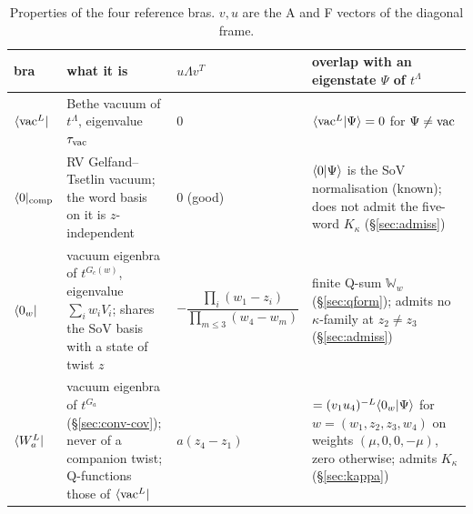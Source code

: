 \begin{table}[ht]
\centering
\footnotesize
\renewcommand{\arraystretch}{1.3}
\begin{tabular}{@{}>{\raggedright\arraybackslash}p{}>{\raggedright\arraybackslash}p{}>{\raggedright\arraybackslash}p{}>{\raggedright\arraybackslash}p{}@{}}
\toprule
bra & what it is & $u\Lambda v^T$ & overlap with an eigenstate $\Psi$ of $t^\Lambda$\\
\midrule
$\langle\mathrm{vac}^L|$ & Bethe vacuum of $t^\Lambda$, eigenvalue $\tau_{\rm vac}$ & $0$ & $\langle\mathrm{vac}^L|\Psi\rangle=0$ for $\Psi\ne\mathrm{vac}$\\
$\langle0|_{\rm comp}$ & RV Gelfand--Tsetlin vacuum; the word basis on it is $z$-independent & $0$ (good) &
 $\langle0|\Psi\rangle$ is the SoV normalisation (known); does not admit the five-word $K_\kappa$ (\S\ref{sec:admiss})\\
$\langle0_w|$ & vacuum eigenbra of $t^{G_c(w)}$, eigenvalue $\sum_iw_iV_i$; shares the SoV basis with a state of twist $z$ &
 $-\dfrac{\prod_i(w_1-z_i)}{\prod_{m\le3}(w_4-w_m)}$ &
 finite Q-sum $\mathbb W_w$ (\S\ref{sec:qform}); admits no $\kappa$-family at $z_2\ne z_3$ (\S\ref{sec:admiss})\\
$\langle W_a^L|$ & vacuum eigenbra of $t^{G_a}$ (\S\ref{sec:conv-cov}); never of a companion twist; Q-functions those of $\langle\mathrm{vac}^L|$ &
 $a(z_4-z_1)$ &
 $=(v_1u_4)^{-L}\langle0_w|\Psi\rangle$ for $w=(w_1,z_2,z_3,w_4)$ on weights $(\mu,0,0,-\mu)$, zero otherwise; admits $K_\kappa$ (\S\ref{sec:kappa})\\
\bottomrule
\end{tabular}
\caption{Properties of the four reference bras. $v,u$ are the A and F vectors of the diagonal frame.}
\label{tab:refbras-prop}
\end{table}

